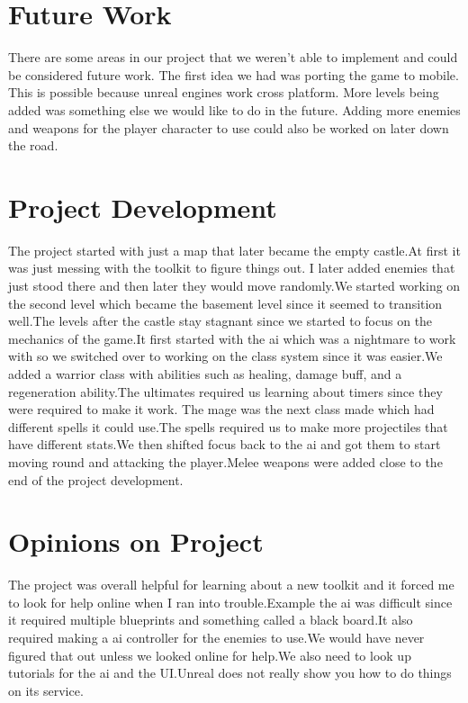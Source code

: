 \documentclass{sigchi}
\begin{document}
\section{Future Work}
There are some areas in our project that we weren't able to implement and could be considered future work. The first idea we had was porting the game to mobile. This is possible because unreal engines work cross platform. More levels being added was something else we would like to do in the future. Adding more enemies and weapons for the player character to use could also be worked on later down the road. 


\section{Project Development}
The project started with just a map that later became the empty castle.At first it was just messing with the toolkit to figure things out. I later added enemies that just stood there and then later they would move randomly.We started working on the second level which became the basement level since it seemed to transition well.The levels after the castle stay stagnant since we started to focus on the mechanics of the game.It first started with the ai which was a nightmare to work with so we switched over to working on the class system since it was easier.We added a warrior class with abilities such as healing, damage buff, and a regeneration ability.The ultimates required us learning about timers since they were required to make it work. The mage was the next class made which had different spells it could use.The spells required us to make more projectiles that have different stats.We then shifted focus back to the ai and got them to start moving round and attacking the player.Melee weapons were added close to the end of the project development.


\section{Opinions on Project}
The project was overall helpful for learning about a new toolkit and it forced me to look for help online when I ran into trouble.Example the ai was difficult since it required multiple blueprints and something called a black board.It also required making a ai controller for the enemies to use.We would have never figured that out unless we looked online for help.We also need to look up tutorials for the ai and the UI.Unreal does not really show you how to do things on its service.
\end{document}
